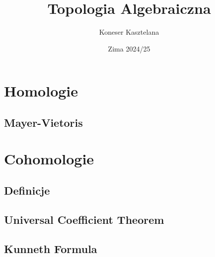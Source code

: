 \documentclass[twoside, a4paper, 12pt]{book}
\title{Topologia Algebraiczna}
\author{\color{subtext1}Koneser Kasztelana}
\date{Zima 2024/25}
\begin{document}
\frontmatter 
\maketitle
\thispagestyle{empty}
\setcounter{page}{0}

\tableofcontents
\mainmatter

\pagestyle{fancy}

\section{Homologie}

\subsection{Mayer-Vietoris}

\section{Cohomologie}

\subsection{Definicje}

\subsection{Universal Coefficient Theorem}

\subsection{Kunneth Formula}
  
\end{document}
